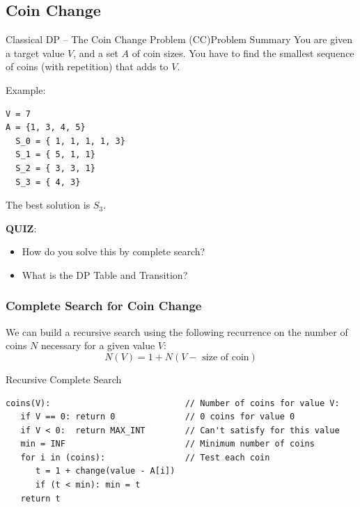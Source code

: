 \subsection{Coin Change}
\begin{frame}[fragile]{Classical DP -- The Coin Change Problem (CC)}{Problem Summary}
  You are given a target value $V$, and a set $A$ of coin sizes. You have to find the smallest sequence of coins (with repetition) that adds to $V$.
  \bigskip

Example:
\begin{verbatim}
V = 7
A = {1, 3, 4, 5}
  S_0 = { 1, 1, 1, 1, 3}
  S_1 = { 5, 1, 1}
  S_2 = { 3, 3, 1}
  S_3 = { 4, 3}
\end{verbatim}

The best solution is $S_3$.\bigskip

{\bf QUIZ}:
\begin{itemize}
  \item How do you solve this by complete search?
  \item What is the DP Table and Transition?
\end{itemize}
\end{frame}

\begin{frame}[fragile]
  \frametitle{Complete Search for Coin Change}

  We can build a recursive search using the following recurrence on the number of coins $N$ necessary for a given value $V$:
  \[N(V) = 1 + N(V-\text{ size of coin})\]

  \begin{block}{Recursive Complete Search}
    {\smaller
\begin{verbatim}
coins(V):                           // Number of coins for value V:
   if V == 0: return 0              // 0 coins for value 0
   if V < 0:  return MAX_INT        // Can't satisfy for this value
   min = INF                        // Minimum number of coins
   for i in (coins):                // Test each coin
      t = 1 + change(value - A[i])
      if (t < min): min = t
   return t
\end{verbatim}
  }
  \end{block}
\end{frame}

